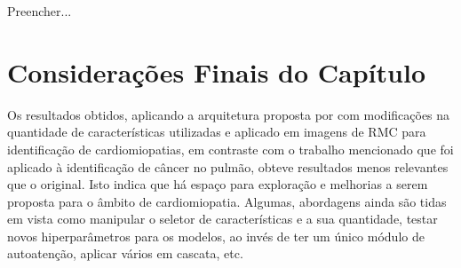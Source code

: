Preencher...

\section{Considerações Finais do Capítulo} 
\label{sec:cap6_consideracoes_finais}

Os resultados obtidos, aplicando a arquitetura proposta por  com modificações na quantidade de características utilizadas e aplicado em imagens de \gls{RMC} para identificação de cardiomiopatias, em contraste com o trabalho mencionado que foi aplicado à identificação de câncer no pulmão, obteve resultados menos relevantes que o original. Isto indica que há espaço para exploração e melhorias a serem proposta para o âmbito de cardiomiopatia. Algumas, abordagens ainda são tidas em vista como manipular o seletor de características e a sua quantidade, testar novos hiperparâmetros para os modelos, ao invés de ter um único módulo de autoatenção, aplicar vários em cascata, etc.

